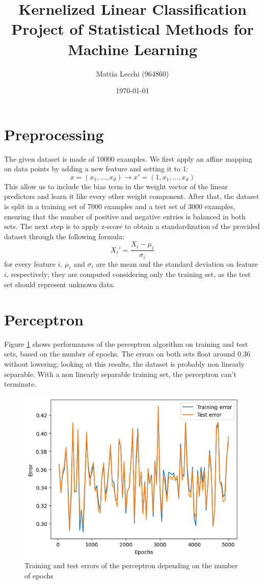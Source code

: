\documentclass{article}
\author{Mattia Lecchi (964860)}
\date{\today}
\title{Kernelized Linear Classification \\ 
	\large Project of Statistical Methods for Machine Learning}
\begin{document}
\maketitle

\section{Preprocessing}
\label{sec:preprocessing}
The given dataset is made of 10000 examples. We first apply an affine mapping on data points by adding a new feature and setting it to 1:
\begin{equation}
	x = (x_1, ..., x_d) \rightarrow x'=(1, x_1, ..., x_d)
\end{equation}
This allow us to include the bias term in the weight vector of the linear predictors and learn it like every other weight component. After that, the dataset is split in a training set of 7000 examples and a test set of 3000 examples, ensuring that the number of positive and negative entries is balanced in both sets.
The next step is to apply z-score to obtain a standardization of the provided dataset through the following formula:
\begin{equation}
	X_i' = \frac{X_i - \mu_i}{\sigma_i}
\end{equation}
for every feature $i$. $\mu_i$ and $\sigma_i$ are the mean and the standard deviation on feature $i$, respectively; they are computed considering only the training set, as the test set should represent unknown data.

\section{Perceptron}

Figure \ref{fig:perceptron} shows performances of the perceptron algorithm on training and test sets, based on the number of epochs. 
The errors on both sets float around 0.36 without lowering; looking at this results, the dataset is probably non linearly separable. With a non linearly separable training set, the perceptron can't terminate.

\begin{figure}
	\centering
	\includegraphics[width=0.5\columnwidth]{../plots/perceptron.png}
	\caption{Training and test errors of the perceptron depending on the number of epochs}
	\label{fig:perceptron}
\end{figure}
\end{document}
